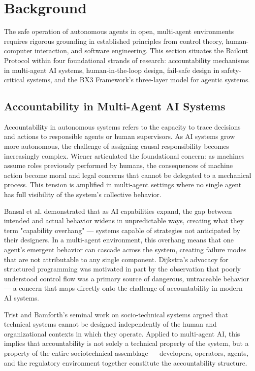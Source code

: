 \section{Background}

The safe operation of autonomous agents in open, multi-agent environments requires rigorous grounding in established principles from control theory, human-computer interaction, and software engineering. This section situates the Bailout Protocol within four foundational strands of research: accountability mechanisms in multi-agent AI systems, human-in-the-loop design, fail-safe design in safety-critical systems, and the BX3 Framework's three-layer model for agentic systems.


\subsection{Accountability in Multi-Agent AI Systems}

Accountability in autonomous systems refers to the capacity to trace decisions and actions to responsible agents or human supervisors. As AI systems grow more autonomous, the challenge of assigning causal responsibility becomes increasingly complex. Wiener \cite{wiener1948} articulated the foundational concern: as machines assume roles previously performed by humans, the consequences of machine action become moral and legal concerns that cannot be delegated to a mechanical process. This tension is amplified in multi-agent settings where no single agent has full visibility of the system's collective behavior.

Bansal et al. \cite{bansal2019} demonstrated that as AI capabilities expand, the gap between intended and actual behavior widens in unpredictable ways, creating what they term "capability overhang" — systems capable of strategies not anticipated by their designers. In a multi-agent environment, this overhang means that one agent's emergent behavior can cascade across the system, creating failure modes that are not attributable to any single component. Dijkstra's advocacy for structured programming \cite{dijkstra1982} was motivated in part by the observation that poorly understood control flow was a primary source of dangerous, untraceable behavior — a concern that maps directly onto the challenge of accountability in modern AI systems.

Trist and Bamforth's seminal work on socio-technical systems \cite{tristr81} argued that technical systems cannot be designed independently of the human and organizational contexts in which they operate. Applied to multi-agent AI, this implies that accountability is not solely a technical property of the system, but a property of the entire sociotechnical assemblage — developers, operators, agents, and the regulatory environment together constitute the accountability structure.

